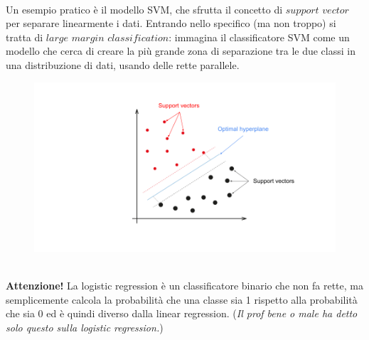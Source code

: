 \\
Un esempio pratico è il modello SVM, che sfrutta il concetto di $support$ $vector$ per separare linearmente i dati. Entrando nello specifico (ma non troppo) si tratta di $large$ $margin$ $classification$: immagina il classificatore SVM come un modello che cerca di creare la più grande zona di separazione tra le due classi in una distribuzione di dati, usando delle rette parallele. 
\\
\begin{figure}[th]
    \centering
    \includegraphics[scale=0.25]{ML/img/hyperplane.png}
\end{figure}
\\
\textbf{Attenzione!} La logistic regression è un classificatore binario che non fa rette, ma semplicemente calcola la probabilità che una classe sia 1 rispetto alla probabilità che sia 0 ed è quindi diverso dalla linear regression. (\textit{Il prof bene o male ha detto solo questo sulla logistic regression.})

\newpage

